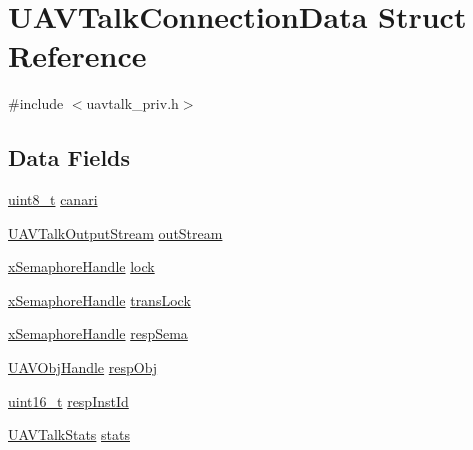 \hypertarget{struct_u_a_v_talk_connection_data}{\section{U\-A\-V\-Talk\-Connection\-Data Struct Reference}
\label{struct_u_a_v_talk_connection_data}
}


{\ttfamily \#include $<$uavtalk\-\_\-priv.\-h$>$}

\subsection*{Data Fields}
\begin{DoxyCompactItemize}
\item 
\hyperlink{stdint_8h_aba7bc1797add20fe3efdf37ced1182c5}{uint8\-\_\-t} \hyperlink{struct_u_a_v_talk_connection_data_a7fcfd5eef5b464048953ae8a62995142}{canari}
\item 
\hyperlink{group___open_pilot_libraries_ga0c67fb4d23157d56fe1982e4788938c7}{U\-A\-V\-Talk\-Output\-Stream} \hyperlink{struct_u_a_v_talk_connection_data_a9fbab27aee45e892087f580683fcec5f}{out\-Stream}
\item 
\hyperlink{_common_2_libraries_2_free_r_t_o_s_2_source_2include_2semphr_8h_aa91aa1b6835a184838f9ccf138a6ad10}{x\-Semaphore\-Handle} \hyperlink{struct_u_a_v_talk_connection_data_ad1614e80f39f9dfbe062a5cb7375387b}{lock}
\item 
\hyperlink{_common_2_libraries_2_free_r_t_o_s_2_source_2include_2semphr_8h_aa91aa1b6835a184838f9ccf138a6ad10}{x\-Semaphore\-Handle} \hyperlink{struct_u_a_v_talk_connection_data_aba8ea97fea7c1cbd1bf09b5706cfffeb}{trans\-Lock}
\item 
\hyperlink{_common_2_libraries_2_free_r_t_o_s_2_source_2include_2semphr_8h_aa91aa1b6835a184838f9ccf138a6ad10}{x\-Semaphore\-Handle} \hyperlink{struct_u_a_v_talk_connection_data_a8ae2519b555461363d46f9b27a80d051}{resp\-Sema}
\item 
\hyperlink{group___n_a_m_e_gac31715ab50a1903838e7d87c8022ec75}{U\-A\-V\-Obj\-Handle} \hyperlink{struct_u_a_v_talk_connection_data_af0a71495a3337b87b43dcfdda5424ade}{resp\-Obj}
\item 
\hyperlink{stdint_8h_a273cf69d639a59973b6019625df33e30}{uint16\-\_\-t} \hyperlink{struct_u_a_v_talk_connection_data_a88e0af1586f91007f920afeb962b759f}{resp\-Inst\-Id}
\item 
\hyperlink{struct_u_a_v_talk_stats}{U\-A\-V\-Talk\-Stats} \hyperlink{struct_u_a_v_talk_connection_data_ac81dea7c4ec7ecc0fb400374796e4caf}{stats}

\end{DoxyCompactItemize}
